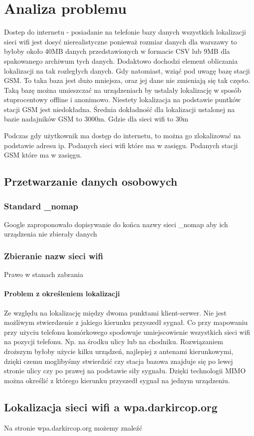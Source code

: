 \chapter{Analiza problemu}
Dostep do internetu - posiadanie na telefonie bazy danych wszystkich lokalizacji sieci wifi jest dosyć nierealistyczne ponieważ rozmiar danych dla warszawy to byłoby około 40MB danych przedstawionych w formacie CSV lub 9MB dla spakowanego archiwum tych danych. Dodaktowo dochodzi element obliczania lokalizacji na tak rozległych danych. Gdy natomiast, wziąć pod uwagę bazę stacji GSM. To taka baza jest dużo mniejsza, oraz jej dane nie zmieniają się tak często. Taką bazę można umieszczać na urządzeniach by ustalały lokalizację w sposób stuprocentowy offline i anonimowo. Niestety lokalizacja na podstawie puntków stacji GSM jest niedokładna. Średnia dokładność dla lokalizacji ustalonej na bazie nadajników GSM to 3000m. Gdzie dla sieci wifi to 30m


Podczas gdy użytkownik ma dostęp do internetu, to można go zlokalizować na podstawie adresu ip. Podanych sieci wifi które ma w zasięgu. Podanych stacji GSM które ma w zasięgu.

\section{Przetwarzanie danych osobowych}

\subsection{Standard \_nomap}
Google zaproponowało dopisywanie do końca nazwy sieci _nomap aby ich urządzenia nie zbierały danych
\subsection{Zbieranie nazw sieci wifi}
Prawo w stanach zabrania

\subsubsection{Problem z określeniem lokalizacji}
Ze względu na lokalizację między dwoma punktami klient-serwer. Nie jest możliwym stwierdzenie z jakiego kierunku przyszedł sygnał. Co przy mapowaniu przy użyciu telefonu komórkowego spodowuje umiejscowienie wszystkich sieci wifi na pozycji telefonu. Np. na środku ulicy lub na chodniku. Rozwiązaniem droższym byłoby użycie kilku urządzeń, najlepiej z antenami kierunkowymi, dzięki czemu moglibyśmy stwierdzić czy stacja bazowa znajduje się po lewej stronie ulicy czy po prawej na podstawie siły sygnału.
Dzięki technologii MIMO można określić z którego kierunku przyszedł sygnał na jednym urządzeniu.

\section{Lokalizacja sieci wifi a wpa.darkircop.org}
Na stronie wpa.darkircop.org możemy znaleźć 
